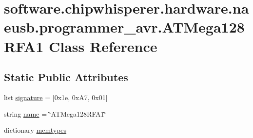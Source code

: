 \hypertarget{classsoftware_1_1chipwhisperer_1_1hardware_1_1naeusb_1_1programmer__avr_1_1ATMega128RFA1}{}\section{software.\+chipwhisperer.\+hardware.\+naeusb.\+programmer\+\_\+avr.\+A\+T\+Mega128\+R\+F\+A1 Class Reference}
\label{classsoftware_1_1chipwhisperer_1_1hardware_1_1naeusb_1_1programmer__avr_1_1ATMega128RFA1}
\subsection*{Static Public Attributes}
\begin{DoxyCompactItemize}
\item 
list \hyperlink{classsoftware_1_1chipwhisperer_1_1hardware_1_1naeusb_1_1programmer__avr_1_1ATMega128RFA1_abd6cd5dd1d8d4f3cbb5c0741caef967d}{signature} = \mbox{[}0x1e, 0x\+A7, 0x01\mbox{]}
\item 
string \hyperlink{classsoftware_1_1chipwhisperer_1_1hardware_1_1naeusb_1_1programmer__avr_1_1ATMega128RFA1_a49dad48786d592e3fae8ea19308bf9bf}{name} = \char`\"{}A\+T\+Mega128\+R\+F\+A1\char`\"{}
\item 
dictionary \hyperlink{classsoftware_1_1chipwhisperer_1_1hardware_1_1naeusb_1_1programmer__avr_1_1ATMega128RFA1_ad2aa25493c0ae1f5d1786c7f61adb5a2}{memtypes}
\end{DoxyCompactItemize}


